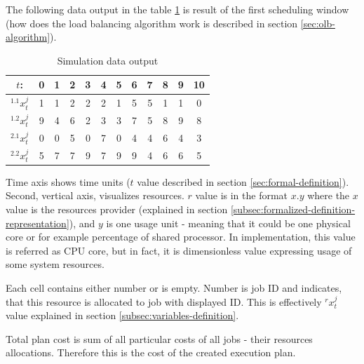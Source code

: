 The following data output in the table \ref{table:execution-plan} is result of the first scheduling window 
(how does the load balancing algorithm work is described in section \ref{sec:olb-algorithm}).

\begin{table}[ht]
	\centering
	\caption{Simulation data output}
	\begin{tabular}{|c|c c c c c c c c c c c|} 
		\hline
		$t$:              & 0 & 1 & 2 & 3 & 4 & 5 & 6 & 7 & 8 & 9 & 10 \\
		\hline\hline
		$^{1.1}x_{t}^{j}$ & 1 & 1 & 2 & 2 & 2 & 1 & 5 & 5 & 1 & 1 & 0  \\
		$^{1.2}x_{t}^{j}$ & 9 & 4 & 6 & 2 & 3 & 3 & 7 & 5 & 8 & 9 & 8  \\
		\hline
		$^{2.1}x_{t}^{j}$ & 0 & 0 & 5 & 0 & 7 & 0 & 4 & 4 & 6 & 4 & 3  \\
		$^{2.2}x_{t}^{j}$ & 5 & 7 & 7 & 9 & 7 & 9 & 9 & 4 & 6 & 6 & 5  \\
		\hline
	\end{tabular}
	\label{table:execution-plan}
\end{table}

Time axis shows time units ($t$ value described in section \ref{sec:formal-definition}).
Second, vertical axis, visualizes resources.
$r$ value is in the format $x.y$ where the $x$ value is the resources provider (explained in section \ref{subsec:formalized-definition-representation}),
and $y$ is one usage unit - meaning that it could be one physical core or for example percentage of shared processor.
In implementation, this value is referred as CPU core,
but in fact, it is dimensionless value expressing usage of some system resources.

Each cell contains either number or is empty.
Number is job ID and indicates, that this resource is allocated to job with displayed ID.
This is effectively $^{r}x_{t}^{j}$ value explained in section \ref{subsec:variables-definition}.

Total plan cost is sum of all particular costs of all jobs - their resources allocations.
Therefore this is the cost of the created execution plan.